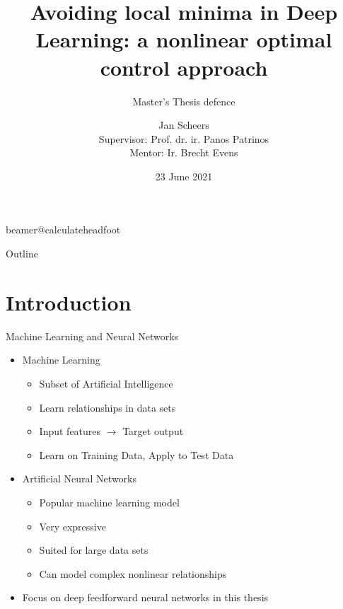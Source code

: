 \documentclass[11pt,t]{beamer}
\title[Avoiding local minima in Deep Learning]{Avoiding local minima in Deep Learning: a nonlinear optimal control approach} %
\subtitle{Master's Thesis defence}
\author{Jan Scheers \\
Supervisor: Prof. dr. ir. Panos Patrinos \\
Mentor: Ir. Brecht Evens}
\date{23 June 2021}
\begin{document}
\csname beamer@calculateheadfoot\endcsname %


\begin{frame}
	\titlepage
\end{frame}
	

\begin{frame}{Outline}
	\hfill	{\large \parbox{.961\textwidth}{\tableofcontents[hideothersubsections]}}
\end{frame}







\section{Introduction}

\begin{frame}[fragile]{Machine Learning and Neural Networks}
   \begin{itemize}
      \itemsep 15pt
      \item Machine Learning
      \begin{itemize}
      	\item Subset of Artificial Intelligence
      	\item Learn relationships in data sets
      	\item Input features $\rightarrow$ Target output
      	\item Learn on Training Data, Apply to Test Data
      \end{itemize}
      \item Artificial Neural Networks
      \begin{itemize}
      	\item Popular machine learning model
      	\item Very expressive
      	\item Suited for large data sets
      	\item Can model complex nonlinear relationships
      \end{itemize}
      \item Focus on deep feedforward neural networks in this thesis
   \end{itemize}
\end{frame}
\end{document}
